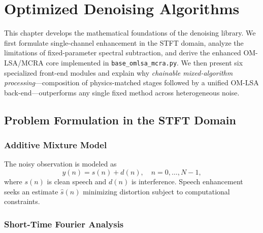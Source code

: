 \chapter{Optimized Denoising Algorithms}
\label{ch:algorithms}

This chapter develops the mathematical foundations of the \projectshort{} denoising library. We first formulate single-channel enhancement in the STFT domain, analyze the limitations of fixed-parameter spectral subtraction, and derive the enhanced OM-LSA/MCRA core implemented in \texttt{base\_omlsa\_mcra.py}. We then present six specialized front-end modules and explain why \emph{chainable mixed-algorithm processing}---composition of physics-matched stages followed by a unified OM-LSA back-end---outperforms any single fixed method across heterogeneous noise.

\section{Problem Formulation in the STFT Domain}
\label{sec:stft_formulation}

\subsection{Additive Mixture Model}

The noisy observation is modeled as
\begin{equation}
  y(n) = s(n) + d(n), \quad n = 0,\ldots,N-1,
  \label{eq:time_mix}
\end{equation}
where $s(n)$ is clean speech and $d(n)$ is interference. Speech enhancement seeks an estimate $\hat{s}(n)$ minimizing distortion subject to computational constraints.

\subsection{Short-Time Fourier Analysis}

